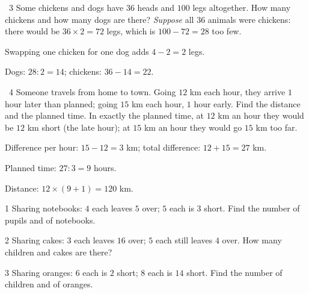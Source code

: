 \gap
\begin{exbox}{\ExWord\ 3}
Some chickens and dogs have $36$ heads and $100$ legs altogether. How many chickens and how many dogs are there?
\guide
\emph{Suppose} all $36$ animals were chickens: there would be $36\times2=72$ legs, which is $100-72=28$ too few.\par
Swapping one chicken for one dog adds $4-2=2$ legs.\par Dogs: $28:2=14$; chickens: $36-14=22$.
\end{exbox}
\gap
\begin{exbox}{\ExWord\ 4}
Someone travels from home to town. Going $12$ km each hour, they arrive $1$ hour later than planned; going $15$ km each hour, $1$ hour early. Find the distance and the planned time.
\guide
In exactly the planned time, at $12$ km an hour they would be $12$ km short (the late hour); at $15$ km an hour they would go $15$ km too far.\par
Difference per hour: $15-12=3$ km; total difference: $12+15=27$ km.\par Planned time: $27:3=9$ hours.\par
Distance: $12\times(9+1)=120$ km.
\end{exbox}
\begin{probbox}{1}{\relax}
Sharing notebooks: $4$ each leaves $5$ over; $5$ each is $3$ short. Find the number of pupils and of notebooks.
\end{probbox}
\gap
\begin{probbox}{2}{\relax}
Sharing cakes: $3$ each leaves $16$ over; $5$ each still leaves $4$ over. How many children and cakes are there?
\end{probbox}
\gap
\begin{probbox}{3}{\relax}
Sharing oranges: $6$ each is $2$ short; $8$ each is $14$ short. Find the number of children and of oranges.
\end{probbox}
